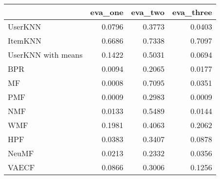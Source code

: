 \begin{tabular}{lrrr}
\toprule
{} &  eva\_one &  eva\_two &  eva\_three \\
\midrule
UserKNN            &   0.0796 &   0.3773 &     0.0403 \\
ItemKNN            &   0.6686 &   0.7338 &     0.7097 \\
UserKNN with means &   0.1422 &   0.5031 &     0.0694 \\
BPR                &   0.0094 &   0.2065 &     0.0177 \\
MF                 &   0.0008 &   0.7095 &     0.0351 \\
PMF                &   0.0009 &   0.2983 &     0.0009 \\
NMF                &   0.0133 &   0.5489 &     0.0144 \\
WMF                &   0.1981 &   0.4063 &     0.2062 \\
HPF                &   0.0383 &   0.3407 &     0.0878 \\
NeuMF              &   0.0213 &   0.2332 &     0.0356 \\
VAECF              &   0.0866 &   0.3006 &     0.1256 \\
\bottomrule
\end{tabular}
